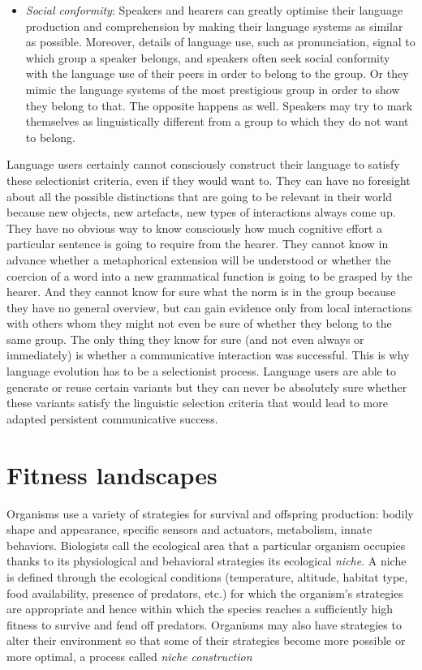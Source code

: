 \begin{itemize}
\item {\itshape Social conformity}: Speakers and hearers can greatly optimise their language production and 
comprehension by making their language systems as similar as possible. Moreover, details of language use, such 
as pronunciation, signal to which group a speaker belongs, and speakers often seek social conformity with the 
language use of their peers in order to belong to the group. Or they mimic the language systems 
of the most prestigious group in order to show they belong to that. The opposite happens as well. Speakers 
may try to mark themselves as linguistically different from a group to which they do not want to belong. 
\end{itemize}

Language users certainly cannot consciously construct their language to satisfy 
these selectionist criteria, even if they would want to. They can have no 
foresight about all the possible distinctions that are going to be relevant in their world because new objects, 
new artefacts, new types of interactions always come up. They have no obvious way to know 
consciously how much cognitive effort a particular sentence is going to require from the hearer. They
cannot know in advance whether a metaphorical extension will be understood or whether the coercion of a 
word into a new grammatical function is going to be grasped by the hearer. And they cannot know for sure 
what the norm is in the group because they have no general overview, but can gain evidence only from 
local interactions with others whom they might not even be sure of whether they belong to the 
same group. The only thing they know for sure
(and not even always or immediately) is whether a communicative interaction was successful. 
This is why language evolution has to be a selectionist process. Language users are able to generate or reuse 
certain variants but they can never be absolutely sure whether these variants satisfy the linguistic selection 
criteria that would lead to more adapted persistent communicative success.

\section{Fitness landscapes}

Organisms use a variety of strategies for survival and offspring production:
bodily shape and appearance, specific sensors and actuators, metabolism, 
innate behaviors. Biologists call the ecological area that a particular organism occupies 
thanks to its physiological and behavioral strategies its ecological {\itshape niche}. A niche is defined through the ecological conditions
(temperature, altitude, habitat type, food availability, presence of predators, etc.) for which the organism's strategies
are appropriate and hence within which the species reaches a sufficiently high fitness to survive and fend off predators. 
Organisms may also have strategies to alter their environment so that some of their strategies become more possible or more optimal, 
a process called {\itshape niche construction} \citep{Odling-Smee:2003} 

